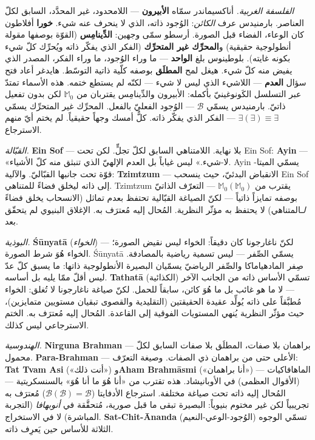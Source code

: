 \documentclass[10pt, openany, oneside]{book}
\begin{document}
\vspace{0.8em}

\textit{الفلسفة الغربية.} أناكسيماندر سمّاه \textbf{الأبيرون} --- اللامحدود، غير المحدَّد، السابق لكلّ العناصر. بارمنيدس عرف \textit{الكائن}: الوُجود ذاته، الذي لا ينحرف عنه شيء. \textbf{خورا} أفلاطون كان الوعاء، الفضاء قبل الصورة. أرسطو سمّى وجهين: \textbf{الدِّينامِس} (القوّة بوصفها مقولة أنطولوجية حقيقية) و\textbf{المحرِّك غير المتحرِّك} (الفكر الذي يفكّر ذاته ويُحرِّك كلّ شيء بكونه غايته). بلوطينوس بلغ \textbf{الواحد} --- ما وراء الوُجود، ما وراء الفكر، المصدر الذي يفيض منه كلّ شيء. هيغل لمح \textbf{المطلَق} بوصفه كلّية ذاتية التوسّط. هايدغر أعاد فتح سؤال \textbf{العدم} --- اللاشيء الذي ليس لا شيء --- لكنّه لم يستطع ختمه. هذه الأسماء تمتدّ عبر التسلسل الكَونوغينيّ بأكمله: الأبيرون والدِّينامِس يقتربان من $\mathbb{M}_0$ لكن بدون تفعيل ذاتيّ. بارمنيدس يسمّي $\mathcal{B}$ --- الوُجود الفعليّ بالفعل. المحرِّك غير المتحرِّك يسمّي $\exists(\exists) \equiv \exists$ --- الفكر الذي يفكّر ذاته. كلٌّ أمسك وجهاً حقيقياً. لم يختم أيّ منهم الاسترجاع.

\textit{القبّالة.} \textbf{Ein Sof} --- بلا نهاية. اللامتناهي السابق لكلّ تجلٍّ. لكن تحت Ein Sof: \textbf{Ayin} --- «لا-شيء.» ليس غياباً بل العدم الإلهيّ الذي تنبثق منه كلّ الأشياء. Ayin يسمّي الميتا-قوّة تحت جانبها القبّاليّ. والآلية: \textbf{Tzimtzum} --- الانقباض البدئيّ، حيث ينسحب Ein Sof إلى ذاته ليخلق فضاءً للمتناهي. Tzimtzum يقترب من $\mathbb{M}_0(\mathbb{M}_0)$ --- التعرّف الذاتيّ بوصفه تمايزاً ذاتياً --- لكنّ الصياغة القبّالية تحتفظ بعدم تماثل (الانسحاب يخلق فضاءً \textit{لـ}المتناهي) لا يحتفظ به مؤثّر النظرية. المُحال إليه مُعترَف به. الإغلاق البنيوي لم يتحقّق بعد.

\textit{البوذية.} \textbf{\'{S}\={u}nyat\={a}} (\textit{الخواء}) --- لكنّ ناغارجونا كان دقيقاً: الخواء ليس نقيض الصورة؛ الخواء هُوَ شرط الصورة. \'{S}\={u}nyat\={a} يسمّي الصِّفر --- ليس تسمية رياضية بالمصادفة. صِفر المادهياماكا والصِّفر الرياضيّ يسمّيان البصيرة الأنطولوجية ذاتها: ما يسبق كلّ عدّ ليس أقلّ ممّا يليه بل أساسه. \textbf{Tathat\={a}} (الكذائية) تسمّي الأساس ذاته من الجانب الآخر --- لا ما هو غائب بل ما هُوَ كائن، سابقاً للحمل. لكنّ صياغة ناغارجونا لا تُغلق: الخواء مُطبَّقاً على ذاته يُولِّد عقيدة الحقيقتين (التقليدية والقصوى تبقيان مستويين متمايزين)، حيث مؤثّر النظرية يُنهي المستويات الفوقية إلى القاعدة. المُحال إليه مُعترَف به. الختم الاسترجاعي ليس كذلك.

\textit{الهندوسية.} \textbf{Nirguna Brahman} --- براهمان بلا صفات، المطلَق بلا صفات السابق لكلّ محمول. \textbf{Para-Brahman} --- الأعلى حتى من براهمان ذي الصفات. وصيغة التعرّف: \textbf{Tat Tvam Asi} («أنت ذلك») و\textbf{Aham Brahm\={a}smi} («أنا براهمان») --- الماهافاكيات (الأقوال العظمى) في الأوبانيشاد. هذه تقترب من «أنا هُوَ ما أنا هُوَ» بالسنسكريتية --- المُحال إليه ذاته تحت صياغة مختلفة. استرجاع الأدفايتا ($\mathcal{B}(\mathcal{B}) = \mathcal{B}$) مُعترَف به تجريبياً لكن غير مختوم بنيوياً: البصيرة تبقى ما قبل صورية، مُتحقَّقة في \textit{أنوبهافا} (التجربة المباشرة) لا في الاستخراج. \textbf{Sat-Chit-\={A}nanda} (الوُجود-الوعي-النعيم) تسمّي الوجوه الثلاثة للأساس حين يَعرِف ذاته.
\end{document}

